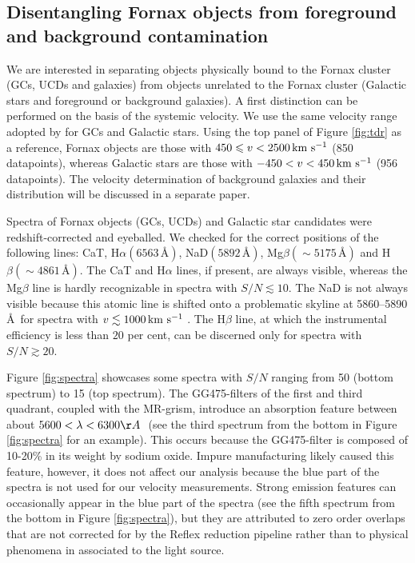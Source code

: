 \documentclass[useAMS,usenatbib]{mn2e}
\newcommand{\kms}{\mbox{\,km~s$^{-1}$}}
\begin{document}
\subsection{Disentangling Fornax objects from foreground and background contamination}

We are interested in separating objects physically bound to the Fornax cluster (GCs, UCDs and galaxies) from objects unrelated to the Fornax cluster (Galactic stars and foreground or background galaxies). A first distinction can be performed on the basis of the systemic velocity. We use the same velocity range adopted by \cite{Schuberth} for GCs and Galactic stars.
Using the top panel of Figure \ref{fig:tdr} as a reference, Fornax objects are those with $450 \le v <2500 \kms$ (850 datapoints), whereas Galactic stars are those with $-450<v<450 \kms$ (956 datapoints). The velocity determination of background galaxies and their distribution will be discussed in a separate paper.

Spectra of Fornax objects (GCs, UCDs) and Galactic star candidates were redshift-corrected and eyeballed. We checked for the correct positions of the following lines: CaT, H$\alpha (6563 \, \mbox{\AA})$, NaD$(5892 \, \mbox{\AA})$, Mg$\beta (\sim 5175 \, \mbox{\AA})$ and H$\beta (\sim 4861\, \mbox{\AA})$. The CaT and H$\alpha$ lines, if present, are always visible, whereas the Mg$\beta$ line is hardly recognizable in spectra with $S/N \lesssim 10$. The NaD is not always visible because this atomic line is shifted onto a problematic skyline at 5860--5890 \AA\ for spectra with $v \lesssim 1000\kms$ . The H$\beta$ line, at which the instrumental efficiency is less than $20$ per cent, can be discerned only for spectra with $S/N \gtrsim 20 $.

Figure \ref{fig:spectra} showcases some spectra with $S/N$ ranging from 50 (bottom spectrum) to 15 (top spectrum). 
The GG475-filters of the first and third quadrant, coupled with the MR-grism, introduce an absorption feature between about $5600 < \lambda < 6300 \AA\ $ (see the third spectrum from the bottom in Figure \ref{fig:spectra} for an example). This occurs because the GG475-filter is composed of 10-20\% in its weight by sodium oxide. Impure manufacturing likely caused this feature, however, it does not affect our analysis because the blue part of the spectra is not used for our velocity measurements. Strong emission features can occasionally appear in the blue part of the spectra (see the fifth spectrum from the bottom in Figure \ref{fig:spectra}), but they are attributed to zero order overlaps that are not corrected for by the Reflex reduction pipeline rather than to physical phenomena in associated to the light source. 
\end{document}
